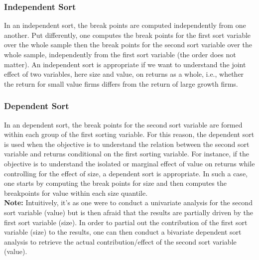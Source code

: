 \documentclass[xcolor=dvipsnames, english, 8pt]{beamer}
\begin{document}
\begin{frame}
    \frametitle{Independent Sort}
    In an independent sort, the break points are computed independently from one another. Put differently, one computes the break points for the first sort variable over the whole sample then the break points for the second sort variable over the whole sample, {\color{ubRed}independently} from the first sort variable (the order does not matter). An independent sort is appropriate if we want to understand the {\color{ubRed}joint} effect of two variables, here size and value, on returns as a whole, i.e., whether the return for small value firms differs from the return of large growth firms.
\end{frame}


\begin{frame}
    \frametitle{Dependent Sort}
    In an dependent sort, the break points for the second sort variable are formed within each group of the first sorting variable. For this reason, the dependent sort is used when the objective is to understand the relation between the second sort variable and returns {\color{ubRed} conditional on the first sorting variable}. For instance, if the objective is to understand the {\color{ubRed}isolated or marginal} effect of value on returns while controlling for the effect of size, a dependent sort is appropriate. In such a case, one starts by computing the break points for size and then computes the breakpoints for value within each size quantile.\vspace{0.5cm}\\
    \textbf{Note:} Intuitively, it's as one were to conduct a univariate analysis for the second sort variable (value) but is then afraid that the results are partially driven by the first sort variable (size). In order to partial out the contribution of the first sort variable (size) to the results, one can then conduct a bivariate dependent sort analysis to retrieve the actual contribution/effect of the second sort variable (value).
\end{frame}
\end{document}
